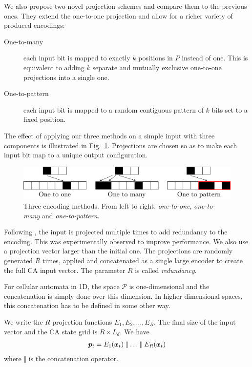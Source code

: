 We also propose two novel projection schemes and compare them to the previous
ones. They extend the one-to-one projection and allow for a richer variety of
produced encodings:

\begin{description}
  \item[One-to-many] each input bit is mapped to exactly $k$ positions in $P$
        instead of one. This is equivalent to adding $k$ separate and mutually
        exclusive one-to-one projections into a single one.
  \item[One-to-pattern] each input bit is mapped to a random contiguous pattern
        of $k$ bits set to a fixed position.
\end{description}

The effect of applying our three methods on a simple input with three components
is illustrated in Fig.~\ref{fig:enc_meth}. Projections are chosen so as to make
each input bit map to a unique output configuration.

\begin{figure}[htbp]
  \centering
  \includegraphics[width=\linewidth]{figures/encoding_methods.pdf}
  \caption{Three encoding methods. From left to right: \emph{one-to-one},
    \emph{one-to-many} and \emph{one-to-pattern}.}\label{fig:enc_meth}
\end{figure}

Following \parencite{yilmazReservoirComputingUsing2014,
  nicheleReservoirComputingUsing2017, nicheleDeepLearningCellular2017}, the
input is projected multiple times to add redundancy to the encoding. This was
experimentally observed to improve performance. We also use a projection vector
larger than the initial one. The projections are randomly generated $R$ times,
applied and concatenated as a single large encoder to create the full CA input
vector. The parameter $R$ is called \emph{redundancy}.

For cellular automata in 1D, the space $\mathcal{P}$ is one-dimensional and the
concatenation is simply done over this dimension. In higher dimensional spaces,
this concatenation has to be defined in some other way.

We write the $R$ projection functions $E_{1}, E_{2}, \ldots, E_{R}$. The
final size of the input vector and the CA state grid is $R \times L_{d}$. We have
\begin{align}
  {\bm{p}}_{t} = E_{1}({\bm{x}}_{t})\mathbin\Vert \ldots \mathbin \Vert E_{R}({\bm{x}}_{t})
\end{align}
where $\mathbin\Vert$ is the concatenation operator.

